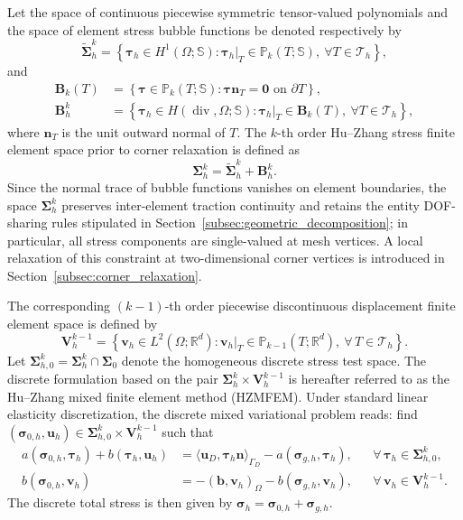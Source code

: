 Let the space of continuous piecewise symmetric tensor-valued polynomials and the space of element stress bubble functions be denoted respectively by
\[
\widetilde{\boldsymbol{\Sigma}}_h^k
=\left\{\boldsymbol{\tau}_h\in H^1(\Omega;\mathbb{S}):\boldsymbol{\tau}_h|_T\in\mathbb P_k(T;\mathbb{S}),\ \forall T\in\mathcal T_h\right\},
\]
and
\[
\begin{aligned}
\boldsymbol B_k(T)
&=\left\{\boldsymbol{\tau}\in\mathbb P_k(T;\mathbb{S}):\boldsymbol{\tau}\boldsymbol n_T=\boldsymbol0\text{ on }\partial T\right\},\\
\boldsymbol B_h^k
&=\left\{\boldsymbol{\tau}_h\in H(\operatorname{div},\Omega;\mathbb{S}):\boldsymbol{\tau}_h|_T\in\boldsymbol B_k(T),\ \forall T\in\mathcal T_h\right\},
\end{aligned}
\]
where $\boldsymbol n_T$ is the unit outward normal of $T$. The $k$-th order Hu--Zhang stress finite element space prior to corner relaxation is defined as~\cite{Hu2015,Chen2017}
\[
\boldsymbol{\Sigma}_h^k=\widetilde{\boldsymbol{\Sigma}}_h^k+\boldsymbol B_h^k.
\]
Since the normal trace of bubble functions vanishes on element boundaries, the space $\boldsymbol{\Sigma}_h^k$ preserves inter-element traction continuity and retains the entity DOF-sharing rules stipulated in Section~\ref{subsec:geometric_decomposition}; in particular, all stress components are single-valued at mesh vertices. A local relaxation of this constraint at two-dimensional corner vertices is introduced in Section~\ref{subsec:corner_relaxation}.

The corresponding $(k-1)$-th order piecewise discontinuous displacement finite element space is defined by
\[
\boldsymbol{V}_h^{k-1} = \left\{ \boldsymbol{v}_h \in L^2(\Omega;\mathbb{R}^d) : \boldsymbol{v}_h|_T \in \mathbb{P}_{k-1}(T;\mathbb{R}^d), \ \forall\,T \in \mathcal{T}_h \right\}.
\]
Let $\boldsymbol{\Sigma}_{h,0}^k = \boldsymbol{\Sigma}_h^k \cap \boldsymbol{\Sigma}_0$ denote the homogeneous discrete stress test space. The discrete formulation based on the pair $\boldsymbol{\Sigma}_h^k \times \boldsymbol{V}_h^{k-1}$ is hereafter referred to as the Hu--Zhang mixed finite element method (HZMFEM). Under standard linear elasticity discretization, the discrete mixed variational problem reads: find $(\boldsymbol{\sigma}_{0,h}, \boldsymbol{u}_h) \in \boldsymbol{\Sigma}_{h,0}^k \times \boldsymbol{V}_h^{k-1}$ such that
\begin{equation}
\label{eq:discrete_mixed_formulation}
\begin{aligned}
a(\boldsymbol{\sigma}_{0,h}, \boldsymbol{\tau}_h) + b(\boldsymbol{\tau}_h, \boldsymbol{u}_h) &= \langle \boldsymbol{u}_D, \boldsymbol{\tau}_h\boldsymbol{n} \rangle_{\Gamma_D} - a(\boldsymbol{\sigma}_{g,h}, \boldsymbol{\tau}_h), && \forall\,\boldsymbol{\tau}_h \in \boldsymbol{\Sigma}_{h,0}^k, \\
b(\boldsymbol{\sigma}_{0,h}, \boldsymbol{v}_h) &= -(\boldsymbol{b},\boldsymbol{v}_h)_\Omega - b(\boldsymbol{\sigma}_{g,h}, \boldsymbol{v}_h), && \forall\,\boldsymbol{v}_h \in \boldsymbol{V}_h^{k-1}.
\end{aligned}
\end{equation}
The discrete total stress is then given by $\boldsymbol{\sigma}_h = \boldsymbol{\sigma}_{0,h} + \boldsymbol{\sigma}_{g,h}$.



